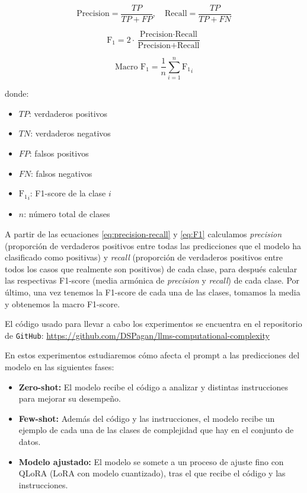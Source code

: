 \documentclass[12pt,twoside]{article}
\begin{document}
\begin{equation}
    \text{Precision}=\frac{TP}{TP+FP}, \quad  \text{Recall}=\frac{TP}{TP+FN}
    \label{eq:precision-recall}
\end{equation}

\begin{equation}
    \text{F}_1 = 2\cdot\frac{\text{Precision}\cdot\text{Recall}}{\text{Precision}+\text{Recall}}
    \label{eq:F1}
\end{equation}

\begin{equation}
    \text{Macro F}_1=\frac{1}{n}\sum_{i=1}^{n}{\text{F}_{1}}_i
\end{equation}

donde:

\begin{itemize}
    \item $TP$: verdaderos positivos
    \item $TN$: verdaderos negativos
    \item $FP$: falsos positivos
    \item $FN$: falsos negativos
    \item ${\text{F}_{1}}_i$: F1-score de la clase $i$
    \item $n$: número total de clases
\end{itemize}

A partir de las ecuaciones \eqref{eq:precision-recall} y \eqref{eq:F1} calculamos \textit{precision} (proporción de verdaderos positivos entre todas las predicciones que el modelo ha clasificado como positivas) y \textit{recall}  (proporción de verdaderos positivos entre todos los casos que realmente son positivos) de cada clase, para después calcular las respectivas F1-score (media armónica de \textit{precision} y \textit{recall}) de cada clase. Por último, una vez tenemos la F1-score de cada una de las clases, tomamos la media y obtenemos la macro F1-score.

El código usado para llevar a cabo los experimentos se encuentra en el repositorio de \texttt{GitHub}: \url{https://github.com/DSPagan/llms-computational-complexity}

En estos experimentos estudiaremos cómo afecta el prompt a las predicciones del modelo en las siguientes fases:

\begin{itemize}
    \item \textbf{Zero-shot:} El modelo recibe el código a analizar y distintas instrucciones para mejorar su desempeño.
    \item \textbf{Few-shot:} Además del código y las instrucciones, el modelo recibe un ejemplo de cada una de las clases de complejidad que hay en el conjunto de datos.
    \item \textbf{Modelo ajustado:} El modelo se somete a un proceso de ajuste fino con QLoRA (LoRA con modelo cuantizado), tras el que recibe el código y las instrucciones.
\end{itemize}
\end{document}
